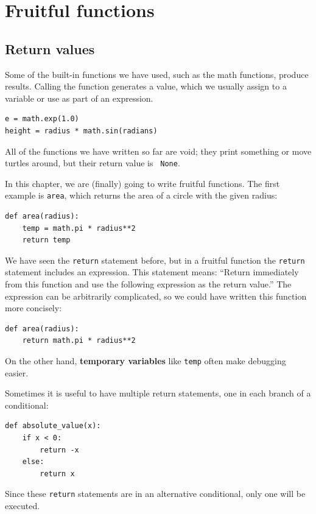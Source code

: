 \documentclass[10pt]{book}
\begin{document}
\chapter{Fruitful functions}
\label{fruitchap}

\section{Return values}

Some of the built-in functions we have used, such as the math
functions, produce results.  Calling the function generates a
value, which we usually assign to a variable or use as part of an
expression.

\beforeverb
\begin{verbatim}
e = math.exp(1.0)
height = radius * math.sin(radians)
\end{verbatim}
\afterverb
%
All of the functions we have written so far are void; they print
something or move turtles around, but their return value is {\tt
None}.

In this chapter, we are (finally) going to write fruitful functions.
The first example is {\tt area}, which returns the area of a circle
with the given radius:

\beforeverb
\begin{verbatim}
def area(radius):
    temp = math.pi * radius**2
    return temp
\end{verbatim}
\afterverb
%
We have seen the {\tt return} statement before, but in a fruitful
function the {\tt return} statement includes
an expression.  This statement means: ``Return immediately from
this function and use the following expression as the return value.''
The expression can be arbitrarily complicated, so we could
have written this function more concisely:


\beforeverb
\begin{verbatim}
def area(radius):
    return math.pi * radius**2
\end{verbatim}
\afterverb
%
On the other hand, {\bf temporary variables} like {\tt temp} often make
debugging easier.


Sometimes it is useful to have multiple return statements, one in each
branch of a conditional:

\beforeverb
\begin{verbatim}
def absolute_value(x):
    if x < 0:
        return -x
    else:
        return x
\end{verbatim}
\afterverb
%
Since these {\tt return} statements are in an alternative conditional,
only one will be executed.
\end{document}

